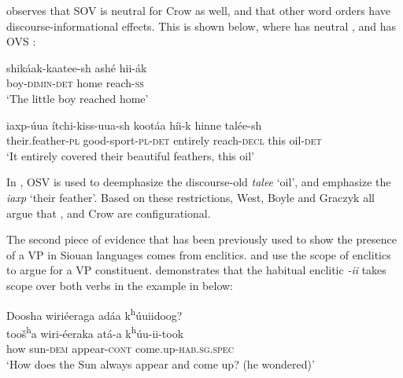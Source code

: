 \documentclass[output=paper]{LSP/langsci}
\begin{document}
\citet{Graczyk1991a} observes that SOV is neutral  for Crow as well, and that other word orders have discourse-informational effects.  This is shown below, where  has neutral , and  has OVS :

\begin{exe}
\ex\label{ex:jrs:25} \gll shik\'aak-kaatee-sh ash\'e 		hii-\'ak \\
boy-\textsc{dimin-det} 		home 	reach-\textsc{ss} \\
\trans `The little boy reached home' \citep[101]{Graczyk1991a}

\ex\label{ex:jrs:26} \gll iaxp-\'uua 		\'itchi-kiss-uua-sh			koot\'aa 	h\'ii-k 	hinne		tal\'ee-sh \\
their.feather-\textsc{pl} good-sport-\textsc{pl}-\textsc{det}		entirely 	reach-\textsc{decl}	this 	oil-\textsc{det} \\
\trans `It entirely covered their beautiful feathers, this oil' \citep[103]{Graczyk1991a}
\end{exe}

In , OSV  is used to deemphasize the discourse-old  \textit{talee} `oil', and emphasize the  \textit{iaxp} `their feather'.  Based on these  restrictions, West, Boyle and Graczyk all argue that ,  and Crow are configurational. 
	
The second piece of evidence that has been previously used to show the presence of a VP in Siouan languages comes from enclitics. \citet{West2003} and \citet{Boyle2007} use the scope of enclitics to argue for a VP constituent. \citet{Boyle2007} demonstrates that the  habitual enclitic \textit{-ii} takes scope over both verbs in the example in  below:

\begin{exe}
\ex\label{ex:jrs:27} 
\glll Doosha	wiri\'eeraga 	ad\'aa 	 k\textsuperscript{h}\'uuiidoog?\\
too\v{s}\textsuperscript{h}a 	wiri-\'eeraka 	at\'a-a k\textsuperscript{h}\'uu-ii-took \\
how 	sun-\textsc{dem} 	appear-\textsc{cont}  come.up-\textsc{hab.sg.spec} \\
\trans `How does the Sun always appear and come up? (he wondered)' \citep[223]{Boyle2007}
\end{exe}
\end{document}
